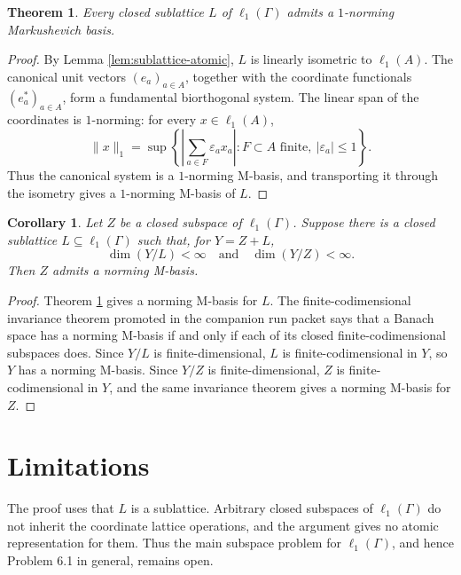 \documentclass[11pt]{amsart}
\newtheorem{theorem}{Theorem}
\newtheorem{corollary}{Corollary}
\theoremstyle{definition}
\begin{document}
\begin{theorem}\label{thm:closed-sublattice}
Every closed sublattice \(L\) of \(\ell_1(\Gamma)\) admits a
\(1\)-norming Markushevich basis.
\end{theorem}

\begin{proof}
By Lemma \ref{lem:sublattice-atomic}, \(L\) is linearly isometric to
\(\ell_1(A)\). The canonical unit vectors \((e_a)_{a\in A}\), together
with the coordinate functionals \((e_a^*)_{a\in A}\), form a fundamental
biorthogonal system. The linear span of the coordinates is \(1\)-norming:
for every \(x\in \ell_1(A)\),
\[
  \|x\|_1
  =\sup\left\{\left|\sum_{a\in F}\varepsilon_a x_a\right|:
       F\subset A \text{ finite},\ |\varepsilon_a|\le 1\right\}.
\]
Thus the canonical system is a \(1\)-norming M-basis, and transporting it
through the isometry gives a \(1\)-norming M-basis of \(L\).
\end{proof}

\begin{corollary}\label{cor:finite-commensurable}
Let \(Z\) be a closed subspace of \(\ell_1(\Gamma)\). Suppose there is a
closed sublattice \(L\subseteq \ell_1(\Gamma)\) such that, for
\(Y=Z+L\),
\[
  \dim(Y/L)<\infty
  \quad\text{and}\quad
  \dim(Y/Z)<\infty .
\]
Then \(Z\) admits a norming M-basis.
\end{corollary}

\begin{proof}
Theorem \ref{thm:closed-sublattice} gives a norming M-basis for \(L\).
The finite-codimensional invariance theorem promoted in the companion run
packet \cite{FiniteCodimPacket} says that a Banach space has a norming
M-basis if and only if each of its closed finite-codimensional subspaces
does. Since \(Y/L\) is finite-dimensional, \(L\) is finite-codimensional
in \(Y\), so \(Y\) has a norming M-basis. Since \(Y/Z\) is
finite-dimensional, \(Z\) is finite-codimensional in \(Y\), and the same
invariance theorem gives a norming M-basis for \(Z\).
\end{proof}

\section*{Limitations}

The proof uses that \(L\) is a sublattice. Arbitrary closed subspaces of
\(\ell_1(\Gamma)\) do not inherit the coordinate lattice operations, and
the argument gives no atomic representation for them. Thus the main
subspace problem for \(\ell_1(\Gamma)\), and hence Problem 6.1 in general,
remains open.
\end{document}
